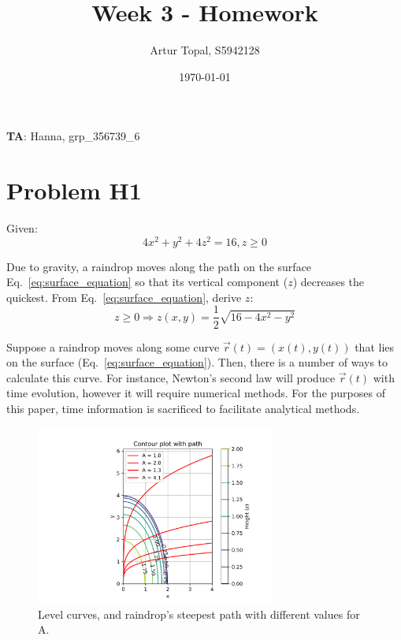 \documentclass{article}
\title{Week 3 - Homework}
\author{Artur Topal, S5942128}
\date{\today}
\begin{document}
\maketitle

\begin{center}
  \textbf{TA}: Hanna, grp\_356739\_6
\end{center}

\pagebreak

\section{ Problem H1 } 
Given:
\begin{equation} \label{eq:surface_equation}
4x^2 + y^2 + 4z^2 = 16, z \ge 0
\end{equation}

Due to gravity, a raindrop moves along the path on the surface Eq.~\eqref{eq:surface_equation} so that its vertical component ($z$) decreases the quickest. From Eq.~\eqref{eq:surface_equation}, derive $z$:
\begin{equation*}
  z \ge 0 \Rightarrow z(x, y) = \frac{1}{2}\sqrt{16 - 4x^2 - y^2}
\end{equation*}

Suppose a raindrop moves along some curve $\vec{r}(t) = (x(t), y(t))$ that lies on the surface (Eq.~\eqref{eq:surface_equation}). Then, there is a number of ways to calculate this curve. For instance, Newton's second law will produce $\vec{r}(t)$ with time evolution, however it will require numerical methods. For the purposes of this paper, time information is sacrificed to facilitate analytical methods.

\begin{figure}[H]
  \centering
  \includegraphics[width=0.7\textwidth]{calculus/W3/img/raindrop.png}
  \caption{Level curves, and raindrop's steepest path with different values for A.}
  \label{fig:raindrop_path}
\end{figure}
\end{document}
